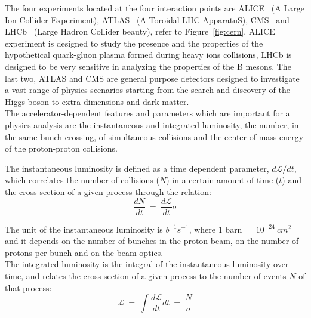 The four experiments located at the four interaction points are
ALICE~\cite{alice_2008} (A Large Ion Collider Experiment),
ATLAS~\cite{atlas_2008} (A Toroidal LHC ApparatuS),
CMS~\cite{cms_2008} and LHCb~\cite{lhcb_2008} (Large Hadron Collider
beauty), refer to Figure~\ref{fig:cern}. ALICE experiment is designed
to study the presence and the properties of the hypothetical
quark-gluon plasma formed during heavy ions collisions, LHCb is
designed to be very sensitive in analyzing the properties of the B
mesons. The last two, ATLAS and CMS are general purpose detectors
designed to investigate a vast range of physics scenarios starting
from the search and discovery of the Higgs boson to extra dimensions
and dark matter. \\

The accelerator-dependent features and parameters which are important for a
physics analysis are the instantaneous and integrated luminosity, the
number, in the same bunch crossing, of simultaneous collisions and the
center-of-mass energy of the proton-proton collisions.

The instantaneous luminosity is defined as a time dependent
parameter, $d\mathcal{L}/dt$, which correlates the number of collisions
($N$) in a certain amount of time ($t$) and the cross section of a
given process through the relation:
\begin{equation}
\label{eq:instalumi}
\frac{dN}{dt} \: = \: \frac{d\mathcal{L}}{dt}\sigma
\end{equation}

The unit of the instantaneous luminosity is $b^{-1}s^{-1}$, where 1
barn $= 10^{-24} \ cm^2$ and it depends on the number of bunches in
the proton beam, on the number of protons per bunch and on the beam
optics. \\
The integrated luminosity is the integral of the instantaneous
luminosity over time, and relates the cross section of a
given process to the number of events $N$ of that process:
\begin{equation}
\label{eq:intelumi}
\mathcal{L} \:=\: \int \frac{d\mathcal{L}}{dt} dt \: = \: \frac{N}{\sigma}
\end{equation}


